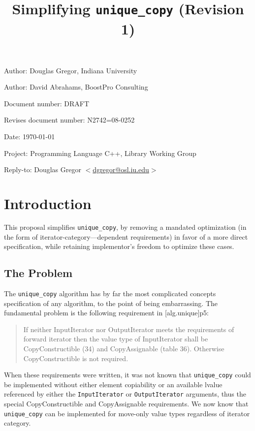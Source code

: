 \documentclass[american]{article}
\newcommand{\code}[1]{\lstinline[basicstyle=\sffamily,keywords={}]{#1}}
\newcommand{\tcode}[1]{\code{#1}}
\begin{document}
\pagestyle{myheadings}

\title{Simplifying \tcode{unique_copy} (Revision 1)}
\author{}

\date{}
\maketitle
\vspace{-0.5in}
\par\noindent Author: Douglas Gregor, Indiana University
\par\noindent Author: David Abrahams, BoostPro Consulting
\par\noindent Document number: DRAFT 
\par\noindent Revises document number: N2742=08-0252
\par\noindent Date: \today
\par\noindent Project: Programming Language C++, Library Working Group
\par\noindent Reply-to: Douglas Gregor $<$\href{mailto:dgregor@osl.iu.edu}{dgregor@osl.iu.edu}$>$

\section{Introduction}
This proposal simplifies \tcode{unique_copy}, by removing a mandated
optimization (in the form of iterator-category---dependent requirements)
in favor of a more direct specification, while retaining implementor's
freedom to optimize these cases.

\subsection{The Problem}
The \tcode{unique_copy} algorithm has by far the most complicated
concepts specification of any algorithm, to the point of being
embarrassing. The fundamental problem is
the following requirement in [alg.unique]p5:

\begin{quote}
  If neither InputIterator nor OutputIterator meets the requirements
  of forward iterator then the value type of InputIterator shall be
  CopyConstructible (34) and CopyAssignable (table 36). Otherwise
  CopyConstructible is not required.
\end{quote}

When these requirements were written, it was not known that \tcode{unique_copy}
could be implemented without either element copiability or an available lvalue
referenced by either the \tcode{InputIterator} or \tcode{OutputIterator}
arguments, thus the special CopyConstructible and CopyAssignable requirements.
We now know that \tcode{unique_copy} can be implemented for move-only value
types regardless of iterator category.
\end{document}
